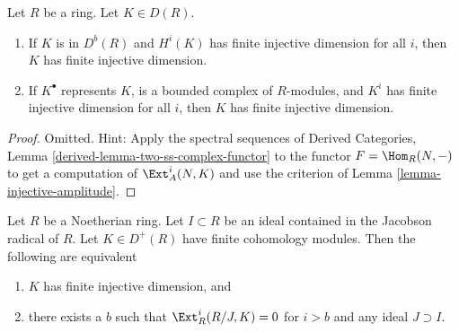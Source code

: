 \begin{lemma}
\label{lemma-finite-injective-dimension}
Let $R$ be a ring. Let $K \in D(R)$.
\begin{enumerate}
\item If $K$ is in $D^b(R)$ and $H^i(K)$ has finite injective dimension
for all $i$, then $K$ has finite injective dimension.
\item If $K^\bullet$ represents $K$, is a bounded complex of $R$-modules,
and $K^i$ has finite injective dimension for all $i$, then $K$ has finite
injective dimension.
\end{enumerate}
\end{lemma}

\begin{proof}
Omitted. Hint: Apply the spectral sequences of
Derived Categories, Lemma \ref{derived-lemma-two-ss-complex-functor}
to the functor $F = \Hom_R(N, -)$ to get a computation of
$\Ext^i_A(N, K)$ and use the criterion of
Lemma \ref{lemma-injective-amplitude}.
\end{proof}

\begin{lemma}
\label{lemma-finite-injective-dimension-Noetherian-radical}
Let $R$ be a Noetherian ring. Let $I \subset R$ be an ideal contained
in the Jacobson radical of $R$. Let $K \in D^+(R)$ have
finite cohomology modules. Then the following are equivalent
\begin{enumerate}
\item $K$ has finite injective dimension, and
\item there exists a $b$ such that $\Ext^i_R(R/J, K) = 0$ for $i > b$
and any ideal $J \supset I$.
\end{enumerate}
\end{lemma}

